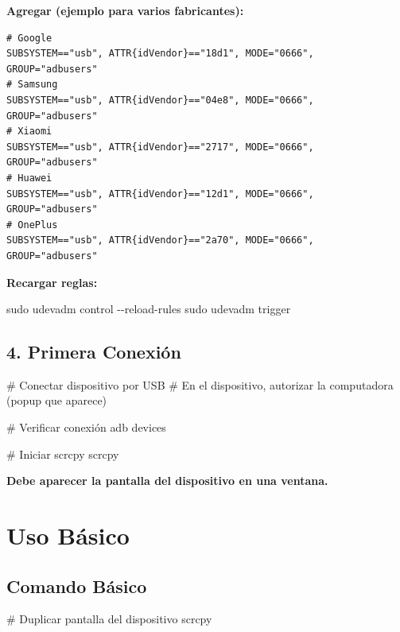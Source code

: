 \documentclass[
  doc,
  floatsintext,
  longtable,
  a4paper,
  nolmodern,
  notxfonts,
  notimes,
  12pt,
  colorlinks=true,linkcolor=blue,citecolor=blue,urlcolor=blue]{apa7}
\newenvironment{Shaded}{\begin{snugshade}}{\end{snugshade}}
\newcommand{\AttributeTok}[1]{\textcolor[rgb]{0.40,0.45,0.13}{#1}}
\newcommand{\CommentTok}[1]{\textcolor[rgb]{0.37,0.37,0.37}{#1}}
\newcommand{\ExtensionTok}[1]{\textcolor[rgb]{0.00,0.23,0.31}{#1}}
\newcommand{\FunctionTok}[1]{\textcolor[rgb]{0.28,0.35,0.67}{#1}}
\newcommand{\NormalTok}[1]{\textcolor[rgb]{0.00,0.23,0.31}{#1}}
\begin{document}
\textbf{Agregar (ejemplo para varios fabricantes):}

\begin{verbatim}
# Google
SUBSYSTEM=="usb", ATTR{idVendor}=="18d1", MODE="0666", GROUP="adbusers"
# Samsung
SUBSYSTEM=="usb", ATTR{idVendor}=="04e8", MODE="0666", GROUP="adbusers"
# Xiaomi
SUBSYSTEM=="usb", ATTR{idVendor}=="2717", MODE="0666", GROUP="adbusers"
# Huawei
SUBSYSTEM=="usb", ATTR{idVendor}=="12d1", MODE="0666", GROUP="adbusers"
# OnePlus
SUBSYSTEM=="usb", ATTR{idVendor}=="2a70", MODE="0666", GROUP="adbusers"
\end{verbatim}

\textbf{Recargar reglas:}

\begin{Shaded}
\begin{Highlighting}[]
\FunctionTok{sudo}\NormalTok{ udevadm control }\AttributeTok{{-}{-}reload{-}rules}
\FunctionTok{sudo}\NormalTok{ udevadm trigger}
\end{Highlighting}
\end{Shaded}

\subsection{4. Primera Conexión}\label{primera-conexiuxf3n}

\begin{Shaded}
\begin{Highlighting}[]
\CommentTok{\# Conectar dispositivo por USB}
\CommentTok{\# En el dispositivo, autorizar la computadora (popup que aparece)}

\CommentTok{\# Verificar conexión}
\ExtensionTok{adb}\NormalTok{ devices}

\CommentTok{\# Iniciar scrcpy}
\ExtensionTok{scrcpy}
\end{Highlighting}
\end{Shaded}

\textbf{Debe aparecer la pantalla del dispositivo en una ventana.}

\section{Uso Básico}\label{uso-buxe1sico}

\subsection{Comando Básico}\label{comando-buxe1sico}

\begin{Shaded}
\begin{Highlighting}[]
\CommentTok{\# Duplicar pantalla del dispositivo}
\ExtensionTok{scrcpy}
\end{Highlighting}
\end{Shaded}
\end{document}
